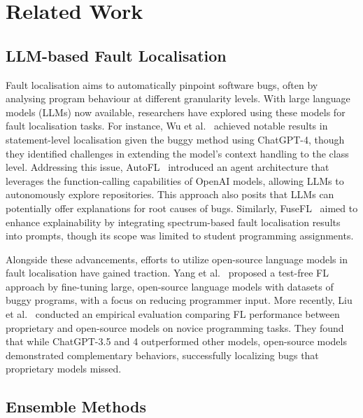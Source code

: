 
\section{Related Work}
\label{sec:relatedwork}

\subsection{LLM-based Fault Localisation}

Fault localisation aims to automatically pinpoint software bugs, often by analysing program behaviour at different granularity levels. With large language models (LLMs) now available, researchers have explored using these models for fault localisation tasks. For instance, Wu et al.~\cite{wuLargeLanguageModels2023} achieved notable results in statement-level localisation given the buggy method using ChatGPT-4, though they identified challenges in extending the model’s context handling to the class level. Addressing this issue, AutoFL~\cite{kangQuantitativeQualitativeEvaluation2024a} introduced an agent architecture that leverages the function-calling capabilities of OpenAI models, allowing LLMs to autonomously explore repositories. This approach also posits that LLMs can potentially offer explanations for root causes of bugs. Similarly, FuseFL~\cite{widyasariDemystifyingFaultyCode2024a} aimed to enhance explainability by integrating spectrum-based fault localisation results into prompts, though its scope was limited to student programming assignments.

Alongside these advancements, efforts to utilize open-source language models in fault localisation have gained traction. Yang et al.~\cite{yangLargeLanguageModels2024a} proposed a test-free FL approach by fine-tuning large, open-source language models with datasets of buggy programs, with a focus on reducing programmer input. More recently, Liu et al.~\cite{liuEmpiricalEvaluationLarge2024} conducted an empirical evaluation comparing FL performance between proprietary and open-source models on novice programming tasks. They found that while ChatGPT-3.5 and 4 outperformed other models, open-source models demonstrated complementary behaviors, successfully localizing bugs that proprietary models missed.

\subsection{Ensemble Methods}

